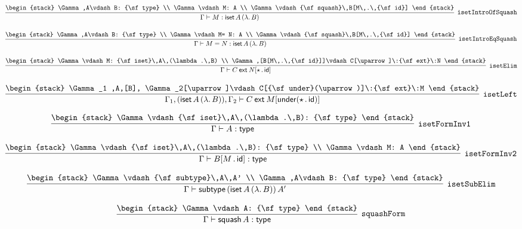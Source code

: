 \[
\infer[{\tt isetIntroOfSquash}]{\Gamma \vdash M: {\sf iset}\,A\,(\lambda .\,B)}{
\begin{stack}
\Gamma ,A\vdash B: {\sf type}
\\
\Gamma \vdash M: A
\\
\Gamma \vdash {\sf squash}\,B[M\,.\,{\sf id}]
\end{stack}}
\]

\[
\infer[{\tt isetIntroEqSquash}]{\Gamma \vdash M= N: {\sf iset}\,A\,(\lambda .\,B)}{
\begin{stack}
\Gamma ,A\vdash B: {\sf type}
\\
\Gamma \vdash M= N: A
\\
\Gamma \vdash {\sf squash}\,B[M\,.\,{\sf id}]
\end{stack}}
\]

\[
\infer[{\tt isetElim}]{\Gamma \vdash C\:{\sf ext}\:N[\star \,.\,{\sf id}]}{
\begin{stack}
\Gamma \vdash M: {\sf iset}\,A\,(\lambda .\,B)
\\
\Gamma ,[B[M\,.\,{\sf id}]]\vdash C[\uparrow ]\:{\sf ext}\:N
\end{stack}}
\]

\[
\infer[{\tt isetLeft}]{\Gamma_1 ,({\sf iset}\,A\,(\lambda .\,B)), \Gamma_2 \vdash C\:{\sf ext}\:M[{\sf under}(\star \,.\,{\sf id})]}{
\begin{stack}
\Gamma_1 ,A,[B], \Gamma_2[\uparrow ]\vdash C[{\sf under}(\uparrow )]\:{\sf ext}\:M
\end{stack}}
\]

\[
\infer[{\tt isetFormInv1}]{\Gamma \vdash A: {\sf type}}{
\begin{stack}
\Gamma \vdash {\sf iset}\,A\,(\lambda .\,B): {\sf type}
\end{stack}}
\]

\[
\infer[{\tt isetFormInv2}]{\Gamma \vdash B[M\,.\,{\sf id}]: {\sf type}}{
\begin{stack}
\Gamma \vdash {\sf iset}\,A\,(\lambda .\,B): {\sf type}
\\
\Gamma \vdash M: A
\end{stack}}
\]

\[
\infer[{\tt isetSubElim}]{\Gamma \vdash {\sf subtype}\,({\sf iset}\,A\,(\lambda .\,B))\,A'}{
\begin{stack}
\Gamma \vdash {\sf subtype}\,A\,A'
\\
\Gamma ,A\vdash B: {\sf type}
\end{stack}}
\]

\[
\infer[{\tt squashForm}]{\Gamma \vdash {\sf squash}\,A: {\sf type}}{
\begin{stack}
\Gamma \vdash A: {\sf type}
\end{stack}}
\]

